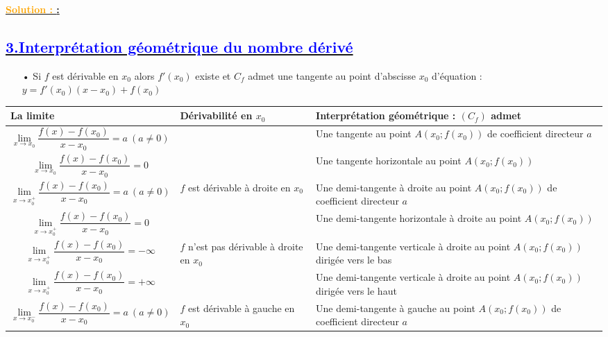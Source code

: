 \documentclass{article}
\newcounter{solution}
\newcommand{\solution}{%
  \refstepcounter{solution}%
  \textbf{\textcolor{orange}{Solution \thesolution : }} \ignorespaces
}
\begin{document}
			\textbf{\underline{\solution:}}

\subsection*{\underline{\textbf{\textcolor{blue}{3.Interprétation géométrique du nombre dérivé}}}}
\begin{itemize}
		\item[•] Si \( f \) est dérivable en \( x_{0} \) alors \( f'(x_{0}) \) existe et \( C_{f} \) admet une tangente au point d’abscisse \( x_{0} \) d'équation : \( y=f'(x_{0})(x-x_{0}) + f(x_{0}) \)
\end{itemize}
\begin{table}[H]
\centering
\renewcommand{\arraystretch}{1.5}
\begin{tabular}{|>{\centering\arraybackslash}m{5cm}|>{\centering\arraybackslash}m{3cm}|>{\centering\arraybackslash}m{6cm}|}
\hline
\textbf{La limite} & \textbf{Dérivabilité en \( x_0 \)} & \textbf{Interprétation géométrique : \( (C_f) \) admet} \\
\hline
\[\lim_{x \to x_0} \frac{f(x) - f(x_0)}{x - x_0} = a \ (a \neq 0)\] & \multirow{2}{*}{\(f\) est dérivable en \(x_0\)} & Une tangente au point \( A \left(x_0; f(x_0)\right) \) de coefficient directeur \(a\) \\
\cline{1-1} \cline{3-3}
\[\lim_{x \to x_0} \frac{f(x) - f(x_0)}{x - x_0} = 0 \] &  & Une tangente horizontale au point \( A \left(x_0; f(x_0)\right) \) \\
\hline
\[\lim_{x \to x_0^+} \frac{f(x) - f(x_0)}{x - x_0} = a \ (a \neq 0) \] & \(f\) est dérivable à droite en \(x_0\) & Une demi-tangente à droite au point \( A \left(x_0; f(x_0)\right) \) de coefficient directeur \(a\) \\
\cline{1-1} \cline{3-3} 
\[\lim_{x \to x_0^+} \frac{f(x) - f(x_0)}{x - x_0} = 0 \] &  & Une demi-tangente horizontale à droite au point \( A \left(x_0; f(x_0)\right) \) \\
\hline
\[\lim_{x \to x_0^+} \frac{f(x) - f(x_0)}{x - x_0} = -\infty \] & \(f\) n'est pas dérivable à droite en \(x_0\) & Une demi-tangente verticale à droite au point \( A \left(x_0; f(x_0)\right) \) dirigée vers le bas \\
\cline{1-1} \cline{3-3}
\[\lim_{x \to x_0^+} \frac{f(x) - f(x_0)}{x - x_0} = +\infty \] &  & Une demi-tangente verticale à droite au point \( A \left(x_0; f(x_0)\right) \) dirigée vers le haut \\
\hline
\[\lim_{x \to x_0^-} \frac{f(x) - f(x_0)}{x - x_0} = a \ (a \neq 0) \] & \(f\) est dérivable à gauche en \(x_0\) & Une demi-tangente à gauche au point \( A \left(x_0; f(x_0)\right) \) de coefficient directeur \(a\) \\

\end{tabular}
\end{table}
\end{document}
